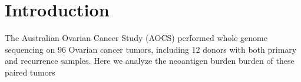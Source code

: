 \section*{Introduction}

The Australian Ovarian Cancer Study (AOCS) performed whole genome sequencing on 96 Ovarian cancer tumors, including 12 donors with both primary and recurrence samples. Here we analyze the neoantigen burden burden of these paired tumors 